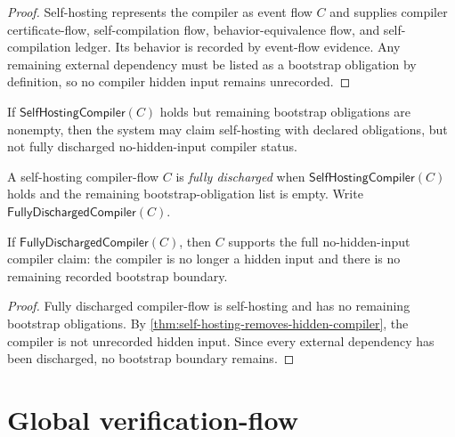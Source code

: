 \begin{proof}
Self-hosting represents the compiler as event flow $C$ and supplies compiler certificate-flow, self-compilation flow, behavior-equivalence flow, and self-compilation ledger. Its behavior is recorded by event-flow evidence. Any remaining external dependency must be listed as a bootstrap obligation by definition, so no compiler hidden input remains unrecorded.
\end{proof}

\begin{corollary}
\label{cor:self-hosting-obligations-block-full-discharge}
If $\mathsf{SelfHostingCompiler}(C)$ holds but remaining bootstrap obligations are nonempty, then the system may claim self-hosting with declared obligations, but not fully discharged no-hidden-input compiler status.
\end{corollary}

\begin{definition}
\label{def:self-hosting-fully-discharged}
A self-hosting compiler-flow $C$ is \emph{fully discharged} when $\mathsf{SelfHostingCompiler}(C)$ holds and the remaining bootstrap-obligation list is empty. Write $\mathsf{FullyDischargedCompiler}(C)$.
\end{definition}

\begin{theorem}
\label{thm:self-hosting-fully-discharged-supports-full-claim}
If $\mathsf{FullyDischargedCompiler}(C)$, then $C$ supports the full no-hidden-input compiler claim: the compiler is no longer a hidden input and there is no remaining recorded bootstrap boundary.
\end{theorem}

\begin{proof}
Fully discharged compiler-flow is self-hosting and has no remaining bootstrap obligations. By \autoref{thm:self-hosting-removes-hidden-compiler}, the compiler is not unrecorded hidden input. Since every external dependency has been discharged, no bootstrap boundary remains.
\end{proof}

\section{Global verification-flow}
\label{sec:self-hosting-global-verification}

